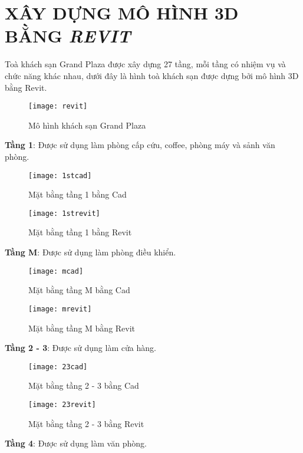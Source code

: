 
\section{XÂY DỰNG MÔ HÌNH 3D BẰNG \emph{REVIT}}
	Toà khách sạn Grand Plaza được xây dựng 27 tầng, mỗi tầng có nhiệm vụ và chức năng khác nhau, dưới đây là hình toà khách sạn được dựng bởi mô hình 3D bằng Revit.

\begin{figure}[H]
  \centering
  \texttt{[image: revit]}
  \caption{Mô hình khách sạn Grand Plaza}
\end{figure} 

\newpage
\textbf{Tầng 1}: Được sử dụng làm phòng cấp cứu, coffee, phòng máy và sảnh văn phòng.
\begin{figure}[H]
  \centering
  \texttt{[image: 1stcad]}
  \caption{Mặt bằng tầng 1 bằng Cad}
\end{figure} 

\begin{figure}[H]
  \centering
  \texttt{[image: 1strevit]}
  \caption{Mặt bằng tầng 1 bằng Revit}
\end{figure} 

\newpage
\textbf{Tầng M}: Được sử dụng làm phòng điều khiển.

\begin{figure}[H]
  \centering
  \texttt{[image: mcad]}
  \caption{Mặt bằng tầng M bằng Cad}
\end{figure} 

\begin{figure}[H]
  \centering
  \texttt{[image: mrevit]}
  \caption{Mặt bằng tầng M bằng Revit}
\end{figure} 

\newpage
\textbf{Tầng 2 - 3}: Được sử dụng làm cửa hàng.

\begin{figure}[H]
  \centering
  \texttt{[image: 23cad]}
  \caption{Mặt bằng tầng 2 - 3 bằng Cad}
\end{figure} 

\begin{figure}[H]
  \centering
  \texttt{[image: 23revit]}
  \caption{Mặt bằng tầng 2 - 3 bằng Revit}
\end{figure} 

\newpage
\textbf{Tầng 4}: Được sử dụng làm văn phòng.

